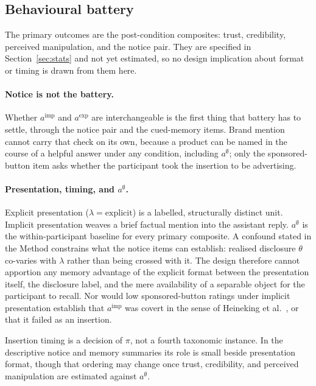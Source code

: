 \documentclass[english]{article}
\begin{document}
\subsection{Behavioural battery}
\label{sec:disc-behaviour}

The primary outcomes are the post-condition composites: trust, credibility, perceived manipulation, and the notice pair. They are specified in Section~\ref{sec:stats} and not yet estimated, so no design implication about format or timing is drawn from them here.

\paragraph{Notice is not the battery.}
Whether \(a^{\mathrm{imp}}\) and \(a^{\mathrm{exp}}\) are interchangeable is the first thing that battery has to settle, through the notice pair and the cued-memory items. Brand mention cannot carry that check on its own, because a product can be named in the course of a helpful answer under any condition, including \(a^{\emptyset}\); only the sponsored-button item asks whether the participant took the insertion to be advertising.

\paragraph{Presentation, timing, and \(a^{\emptyset}\).}
Explicit presentation (\(\lambda=\mathrm{explicit}\)) is a labelled, structurally distinct unit. Implicit presentation weaves a brief factual mention into the assistant reply. \(a^{\emptyset}\) is the within-participant baseline for every primary composite. A confound stated in the Method constrains what the notice items can establish: realised disclosure \(\theta\) co-varies with \(\lambda\) rather than being crossed with it. The design therefore cannot apportion any memory advantage of the explicit format between the presentation itself, the disclosure label, and the mere availability of a separable object for the participant to recall. Nor would low sponsored-button ratings under implicit presentation establish that \(a^{\mathrm{imp}}\) was covert in the sense of Heineking et al.\ \cite{heineking2026detecting}, or that it failed as an insertion.

Insertion timing is a decision of \(\pi\), not a fourth taxonomic instance. In the descriptive notice and memory summaries its role is small beside presentation format, though that ordering may change once trust, credibility, and perceived manipulation are estimated against \(a^{\emptyset}\).
\end{document}
